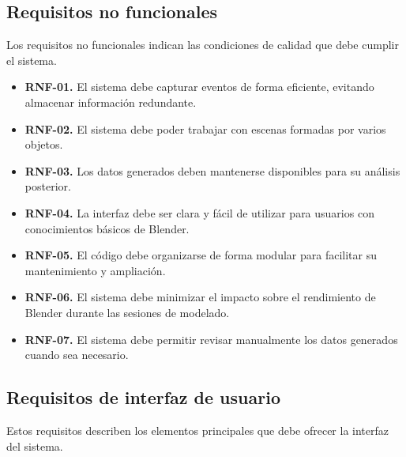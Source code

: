 \subsection{Requisitos no funcionales}

Los requisitos no funcionales indican las condiciones de calidad que debe cumplir el sistema.

\begin{itemize}
    \item \textbf{RNF-01.} El sistema debe capturar eventos de forma eficiente, evitando almacenar información redundante.

    \item \textbf{RNF-02.} El sistema debe poder trabajar con escenas formadas por varios objetos.

    \item \textbf{RNF-03.} Los datos generados deben mantenerse disponibles para su análisis posterior.

    \item \textbf{RNF-04.} La interfaz debe ser clara y fácil de utilizar para usuarios con conocimientos básicos de Blender.

    \item \textbf{RNF-05.} El código debe organizarse de forma modular para facilitar su mantenimiento y ampliación.

    \item \textbf{RNF-06.} El sistema debe minimizar el impacto sobre el rendimiento de Blender durante las sesiones de modelado.

    \item \textbf{RNF-07.} El sistema debe permitir revisar manualmente los datos generados cuando sea necesario.
\end{itemize}

\subsection{Requisitos de interfaz de usuario}

Estos requisitos describen los elementos principales que debe ofrecer la interfaz del sistema.

